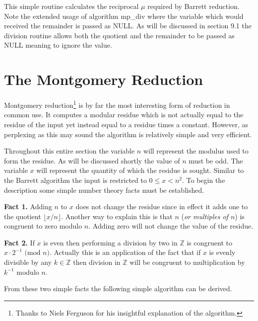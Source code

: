 \documentclass[b5paper]{book}
\def\Z{{\mathbb Z}}
\begin{document}
This simple routine calculates the reciprocal $\mu$ required by Barrett reduction.  Note the extended usage of algorithm mp\_div where the variable
which would received the remainder is passed as NULL.  As will be discussed in section 9.1 the division routine allows both the quotient and the 
remainder to be passed as NULL meaning to ignore the value.  

\section{The Montgomery Reduction}
Montgomery reduction\footnote{Thanks to Niels Ferguson for his insightful explanation of the algorithm.} \cite{MONT} is by far the most interesting 
form of reduction in common use.  It computes a modular residue which is not actually equal to the residue of the input yet instead equal to a 
residue times a constant.  However, as perplexing as this may sound the algorithm is relatively simple and very efficient.  

Throughout this entire section the variable $n$ will represent the modulus used to form the residue.  As will be discussed shortly the value of
$n$ must be odd.  The variable $x$ will represent the quantity of which the residue is sought.  Similar to the Barrett algorithm the input
is restricted to $0 \le x < n^2$.  To begin the description some simple number theory facts must be established.

\textbf{Fact 1.}  Adding $n$ to $x$ does not change the residue since in effect it adds one to the quotient $\lfloor x / n \rfloor$.  Another way
to explain this is that $n$ (\textit{or multiples of $n$}) is congruent to zero modulo $n$.  Adding zero will not change the value of the residue.  

\textbf{Fact 2.}  If $x$ is even then performing a division by two in $\Z$ is congruent to $x \cdot 2^{-1} \mbox{ (mod }n\mbox{)}$.  Actually
this is an application of the fact that if $x$ is evenly divisible by any $k \in \Z$ then division in $\Z$ will be congruent to 
multiplication by $k^{-1}$ modulo $n$.  

From these two simple facts the following simple algorithm can be derived.
\end{document}
